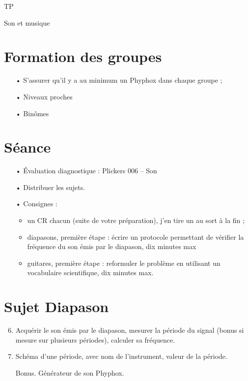 \documentclass[12pt,a4paper]{article}
\begin{document}
\begin{header}
TP

Son et musique
\end{header}

\section*{Formation des groupes}

\begin{enumerate}
\item[•] S'assurer qu'il y a au minimum un Phyphox dans chaque groupe ;
\item[•] Niveaux proches
\item[•] Binômes
\end{enumerate}

\section*{Séance}

\begin{enumerate}
\item[•] Évaluation diagnostique : Plickers 006 -- Son
\item[•] Distribuer les sujets.
\item[•] Consignes :
\begin{itemize}
\item un CR chacun (suite de votre préparation), j'en tire un au sort à la fin ;
\item diapasons, première étape : écrire un protocole permettant de vérifier la fréquence du son émis par le diapason, dix minutes max
\item guitares, première étape : reformuler le problème en utilisant un vocabulaire scientifique, dix minutes max.
\end{itemize}
\end{enumerate}

\section*{Sujet Diapason}

\begin{enumerate}
\setcounter{enumi}{5}
\item \anarai{}

Acquérir le son émis par le diapason, mesurer la période du signal (bonus si mesure sur plusieurs périodes), calculer sa fréquence.

\item \rea{}

Schéma d'une période, avec nom de l'instrument, valeur de la période.

\item[Bonus.] Générateur de son Phyphox.
\end{enumerate}
\end{document}
